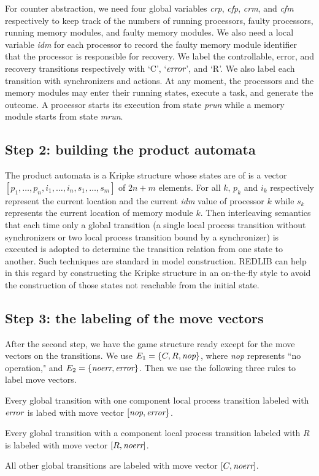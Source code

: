 For counter abstraction, we need four global variables \textit{crp}, \textit{cfp}, 
\textit{crm}, and \textit{cfm} respectively 
to keep track of the numbers of running processors, faulty processors, 
running memory modules, and faulty memory modules. 
We also need a local variable \textit{idm} for each processor to record 
the faulty memory module identifier that the processor is 
responsible for recovery. 
We label the controllable, error, and recovery 
transitions respectively with `C', `$\textit{error}$', and `R'. 
We also label each transition with synchronizers and actions.  
At any moment, the processors and the memory modules 
may enter their running states, execute a task, and generate 
the outcome. 
A processor starts its execution from state \textit{prun} while 
a memory module starts from state \textit{mrun}. 


\subsection*{Step 2: building the product automata}
The product automata is a Kripke structure whose 
states are of is a vector $[p_1,\ldots,p_n,i_1,\ldots,i_n,s_1,\ldots,s_m]$ 
of $2n+m$ elements.  
For all $k$, $p_k$ and $i_k$ respectively represent the 
current location and the current \textit{idm} value of processor $k$ while 
$s_k$ represents the current location of memory module $k$.  
Then interleaving semantics that each time only a global transition 
(a single local process transition without synchronizers 
or two local process transition bound by a synchronizer) is executed 
is adopted to determine the transition relation from one state to another. 
Such techniques are standard in model construction.  
REDLIB can help in this regard by constructing the Kripke structure in 
an on-the-fly style to avoid the construction of those states not reachable 
from the initial state. 

\subsection*{Step 3: the labeling of the move vectors} 
After the second step, we have the game structure ready except for the 
move vectors on the transitions. 
We use $E_1=\{C,R,\mbox{\em nop}\}$, where {\em nop} represents ``no operation,"
and $E_2=\{\textit{noerr},\textit{error}\}$.  
Then we use the following three rules to label move vectors. 
\begin{list1} 
\item Every global transition with one component local process transition labeled 
	with $\textit{error}$ is labed with move vector $[\mbox{\em nop},\textit{error}\}$.  
\item Every global transition with a component local process transition labeled 
	with $R$ 	
	is labeled with move vector $[R,\textit{noerr}]$.  
\item All other global transitions are labeled with move vector $[C,\textit{noerr}]$.  
\end{list1} 


